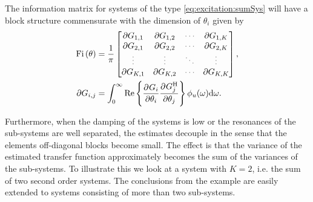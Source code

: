 The information matrix for systems of the type \eqref{eq:excitation:sumSys} will have a block structure commensurate with the dimension of $\theta_i$ given by
\begin{align}
\Fi{\theta} &= \frac{1}{\pi}
\begin{bmatrix}
  \partial G_{1,1}        &\partial G_{1,2}       &\deemph{\cdots}         &\partial G_{1,K}\\
  \partial G_{2,1}        &\partial G_{2,2}       &\deemph{\cdots}         &\partial G_{2,K}\\
  \deemph{\vdots}                  &\deemph{\vdots}                 &\deemph{\ddots}         &\deemph{\vdots}          \\
  \partial G_{K,1}        &\partial G_{K,2}       &\deemph{\cdots}         &\partial G_{K,K}
\end{bmatrix},\\
\partial G_{i,j} &= \int_0^\infty
                      \RealPart\left\{
                          \PartialDerivative{G_i}
                               {\theta_i}
                          \PartialDerivative{G_j^{\HT}}
                               {\theta_j}
                                \right\}
                      \phi_u(\omega)\dd\omega.
\end{align}

Furthermore, when the damping of the systems is low or the resonances of the sub-systems are well separated, the estimates decouple in the sense that the elements off-diagonal blocks become small.
The effect is that the variance of the estimated transfer function approximately becomes the sum of the variances of the sub-systems.
To illustrate this we look at a system with $K=2$, i.e. the sum of two second order systems.
The conclusions from the example are easily extended to systems consisting of more than two sub-systems.

